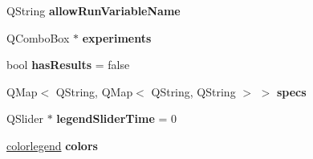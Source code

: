 \begin{DoxyCompactItemize}
Q\+String {\bfseries allow\+Run\+Variable\+Name}
\item 
\mbox{\label{class_graph_widget_a641a6cae2f04a47412b0fd8c0efa2508}} 
Q\+Combo\+Box $\ast$ {\bfseries experiments}
\item 
\mbox{\label{class_graph_widget_a641c181833163b7ed9802ea720990f63}} 
bool {\bfseries has\+Results} = false
\item 
\mbox{\label{class_graph_widget_a692acd7da70406a30837451ae0dc3968}} 
Q\+Map$<$ Q\+String, Q\+Map$<$ Q\+String, Q\+String $>$ $>$ {\bfseries specs}
\item 
\mbox{\label{class_graph_widget_abdaf70bf121df076aa2a3ece35dc8d37}} 
Q\+Slider $\ast$ {\bfseries legend\+Slider\+Time} = 0
\item 
\mbox{\label{class_graph_widget_a82b3da3f06e672c7b7332691673e2cb1}} 
\hyperlink{structcolorlegend}{colorlegend} {\bfseries colors}
\end{DoxyCompactItemize}
